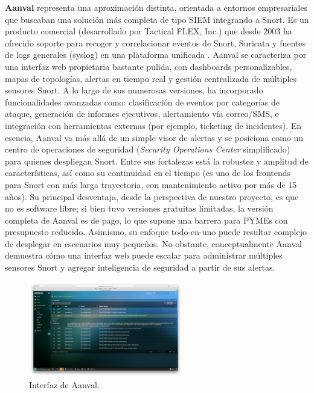 \documentclass[11pt,a4paper,twoside]{report}
\begin{document}
\textbf{Aanval} representa una aproximación distinta, orientada a entornos empresariales que buscaban una solución más completa de tipo SIEM integrando a Snort. Es un producto comercial (desarrollado por Tactical FLEX, Inc.) que desde 2003 ha ofrecido soporte para recoger y correlacionar eventos de Snort, Suricata y fuentes de logs generales (syslog) en una plataforma unificada \cite{AanvalWiki}. Aanval se caracteriza por una interfaz web propietaria bastante pulida, con dashboards personalizables, mapas de topologías, alertas en tiempo real y gestión centralizada de múltiples sensores Snort. A lo largo de sus numerosas versiones, ha incorporado funcionalidades avanzadas como: clasificación de eventos por categorías de ataque, generación de informes ejecutivos, alertamiento vía correo/SMS, e integración con herramientas externas (por ejemplo, ticketing de incidentes). En esencia, Aanval va más allá de un simple visor de alertas y se posiciona como un centro de operaciones de seguridad (\textit{Security Operations Center} simplificado) para quienes despliegan Snort. Entre sus fortalezas está la robustez y amplitud de características, así como su continuidad en el tiempo (es uno de los frontends para Snort con más larga trayectoria, con mantenimiento activo por más de 15 años). Su principal desventaja, desde la perspectiva de nuestro proyecto, es que no es software libre; si bien tuvo versiones gratuitas limitadas, la versión completa de Aanval es de pago, lo que supone una barrera para PYMEs con presupuesto reducido. Asimismo, su enfoque todo-en-uno puede resultar complejo de desplegar en escenarios muy pequeños. No obstante, conceptualmente Aanval demuestra cómo una interfaz web puede escalar para administrar múltiples sensores Snort y agregar inteligencia de seguridad a partir de sus alertas.

\begin{figure}[H]
	\centering
	\includegraphics[width=0.6\textwidth]{documento/20.png}
	\caption{Interfaz de Aanval.}
	\label{fig:aanval}
\end{figure}
\end{document}
